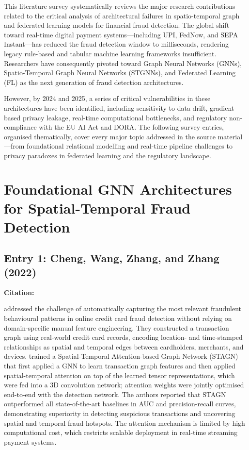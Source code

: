 \documentclass[12pt, a4paper]{article}
\newenvironment{surveyentry}[1]{%
  \vspace{6pt}
  \noindent\textbf{\color{navyblue}#1}\par
  \vspace{2pt}
  \noindent\hspace{1em}%
  \begin{minipage}[t]{0.97\linewidth}
}{%
  \end{minipage}
  \vspace{10pt}
}
\begin{document}
This literature survey systematically reviews the major research contributions related to the critical analysis of architectural failures in spatio-temporal graph and federated learning models for financial fraud detection. The global shift toward real-time digital payment systems---including UPI, FedNow, and SEPA Instant---has reduced the fraud detection window to milliseconds, rendering legacy rule-based and tabular machine learning frameworks insufficient. Researchers have consequently pivoted toward Graph Neural Networks (GNNs), Spatio-Temporal Graph Neural Networks (STGNNs), and Federated Learning (FL) as the next generation of fraud detection architectures.

However, by 2024 and 2025, a series of critical vulnerabilities in these architectures have been identified, including sensitivity to data drift, gradient-based privacy leakage, real-time computational bottlenecks, and regulatory non-compliance with the EU AI Act and DORA. The following survey entries, organised thematically, cover every major topic addressed in the source material---from foundational relational modelling and real-time pipeline challenges to privacy paradoxes in federated learning and the regulatory landscape.

\section{Foundational GNN Architectures for Spatial-Temporal Fraud Detection}

\subsection*{Entry 1: Cheng, Wang, Zhang, and Zhang (2022)}

\begin{surveyentry}{Citation: \cite{cheng2022stagn}}
\cite{cheng2022stagn} addressed the challenge of automatically capturing the most relevant fraudulent behavioural patterns in online credit card fraud detection without relying on domain-specific manual feature engineering. They constructed a transaction graph using real-world credit card records, encoding location- and time-stamped relationships as spatial and temporal edges between cardholders, merchants, and devices. \cite{cheng2022stagn} trained a Spatial-Temporal Attention-based Graph Network (STAGN) that first applied a GNN to learn transaction graph features and then applied spatial-temporal attention on top of the learned tensor representations, which were fed into a 3D convolution network; attention weights were jointly optimised end-to-end with the detection network. The authors reported that STAGN outperformed all state-of-the-art baselines in AUC and precision-recall curves, demonstrating superiority in detecting suspicious transactions and uncovering spatial and temporal fraud hotspots. The attention mechanism is limited by high computational cost, which restricts scalable deployment in real-time streaming payment systems.
\end{surveyentry}
\end{document}
